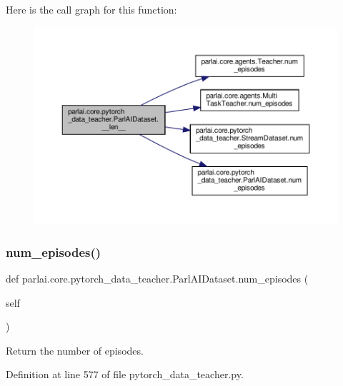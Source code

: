 Here is the call graph for this function\+:
\nopagebreak
\begin{figure}[H]
\begin{center}
\leavevmode
\includegraphics[width=350pt]{classparlai_1_1core_1_1pytorch__data__teacher_1_1ParlAIDataset_aaead6896e0da8032cef53af977359886_cgraph}
\end{center}
\end{figure}
\mbox{\label{classparlai_1_1core_1_1pytorch__data__teacher_1_1ParlAIDataset_a2b59aeb0c912cbee38cd6cd03f5d58db}} 
\subsubsection{\texorpdfstring{num\+\_\+episodes()}{num\_episodes()}}
{\footnotesize\ttfamily def parlai.\+core.\+pytorch\+\_\+data\+\_\+teacher.\+Parl\+A\+I\+Dataset.\+num\+\_\+episodes (\begin{DoxyParamCaption}\item[{}]{self }\end{DoxyParamCaption})}

\begin{DoxyVerb}Return the number of episodes.\end{DoxyVerb}
 

Definition at line 577 of file pytorch\+\_\+data\+\_\+teacher.\+py.



